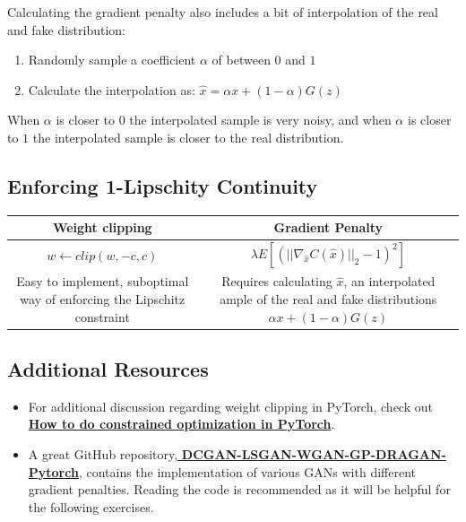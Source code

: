 Calculating the gradient penalty also includes a bit of interpolation of the real and fake distribution:
\begin{enumerate}
    \item Randomly sample a coefficient \(\alpha\) of between \(0\) and \(1\)
    \item Calculate the interpolation as: \(\hat{x} = \alpha x + (1 - \alpha) G(z)\)
\end{enumerate}
When \(\alpha\) is closer to \(0\) the interpolated sample is very noisy, and when \(\alpha\) is closer to \(1\) the interpolated sample is closer to the real distribution.
\subsection{Enforcing 1-Lipschity Continuity}
\begin{table}[!htbp]
    \centering
    \begin{tabular}{c|c}
         Weight clipping & Gradient Penalty\\
         \hline
         \(w \leftarrow clip(w, -c, c)\) & \(\lambda E[(||\nabla_{\hat{x}} C(\hat{x})||_2- 1)^2]\)\\
         Easy to implement, suboptimal way of enforcing the Lipschitz constraint & Requires calculating \(\hat{x}\), an interpolated ample of the real and fake distributions \(\alpha x + (1 - \alpha) G(z)\)\\
    \end{tabular}

\end{table}

\subsection{Additional Resources}
\begin{itemize}
    \item For additional discussion regarding weight clipping in PyTorch, check out \href{https://discuss.pytorch.org/t/how-to-do-constrained-optimization-in-pytorch/60122}{\textbf{How to do constrained optimization in PyTorch}}.
    \item A great GitHub repository,\href{https://github.com/LynnHo/DCGAN-LSGAN-WGAN-GP-DRAGAN-Pytorch}{\textbf{ DCGAN-LSGAN-WGAN-GP-DRAGAN-Pytorch}}, contains the implementation of various GANs with different gradient penalties. Reading the code is recommended as it will be helpful for the following exercises.
\end{itemize}

